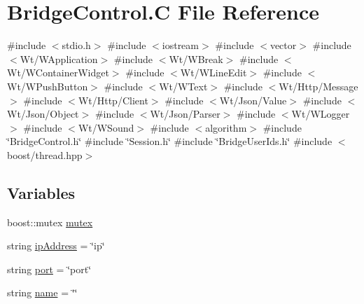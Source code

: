 \hypertarget{_bridge_control_8_c}{}\section{Bridge\+Control.\+C File Reference}
\label{_bridge_control_8_c}
{\ttfamily \#include $<$stdio.\+h$>$}\newline
{\ttfamily \#include $<$iostream$>$}\newline
{\ttfamily \#include $<$vector$>$}\newline
{\ttfamily \#include $<$Wt/\+W\+Application$>$}\newline
{\ttfamily \#include $<$Wt/\+W\+Break$>$}\newline
{\ttfamily \#include $<$Wt/\+W\+Container\+Widget$>$}\newline
{\ttfamily \#include $<$Wt/\+W\+Line\+Edit$>$}\newline
{\ttfamily \#include $<$Wt/\+W\+Push\+Button$>$}\newline
{\ttfamily \#include $<$Wt/\+W\+Text$>$}\newline
{\ttfamily \#include $<$Wt/\+Http/\+Message$>$}\newline
{\ttfamily \#include $<$Wt/\+Http/\+Client$>$}\newline
{\ttfamily \#include $<$Wt/\+Json/\+Value$>$}\newline
{\ttfamily \#include $<$Wt/\+Json/\+Object$>$}\newline
{\ttfamily \#include $<$Wt/\+Json/\+Parser$>$}\newline
{\ttfamily \#include $<$Wt/\+W\+Logger$>$}\newline
{\ttfamily \#include $<$Wt/\+W\+Sound$>$}\newline
{\ttfamily \#include $<$algorithm$>$}\newline
{\ttfamily \#include \char`\"{}Bridge\+Control.\+h\char`\"{}}\newline
{\ttfamily \#include \char`\"{}Session.\+h\char`\"{}}\newline
{\ttfamily \#include \char`\"{}Bridge\+User\+Ids.\+h\char`\"{}}\newline
{\ttfamily \#include $<$boost/thread.\+hpp$>$}\newline
\subsection*{Variables}
\begin{DoxyCompactItemize}
\item 
boost\+::mutex \hyperlink{_bridge_control_8_c_a0ba51deb3be6dd78d799c654b3120e71}{mutex}
\item 
string \hyperlink{_bridge_control_8_c_a7233c697d6e7c8ac9c9223c57144dc6e}{ip\+Address} = \char`\"{}ip\char`\"{}
\item 
string \hyperlink{_bridge_control_8_c_ae969f7204a7e846b98a88497dd85f672}{port} = \char`\"{}port\char`\"{}
\item 
string \hyperlink{_bridge_control_8_c_a8ccf841cb59e451791bcb2e1ac4f1edc}{name} = \char`\"{}\char`\"{}
\end{DoxyCompactItemize}


